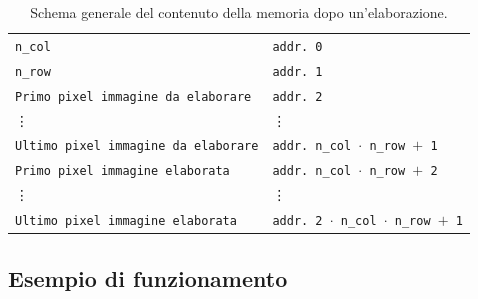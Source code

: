 \documentclass{article}
\begin{document}
\begin{table}[h]
    \centering
    \def\arraystretch{1.3} %
    \caption{Schema generale del contenuto della memoria dopo un'elaborazione.}
    \label{tab:schemamem}
    \begin{tabular}{ |l | l }
        \cline{1-1}
        \texttt{n\_col}                             & \texttt{addr. 0}                                     \\\cline{1-1}
        \texttt{n\_row}                             & \texttt{addr. 1}                                     \\\cline{1-1}
        \texttt{Primo pixel immagine da elaborare}  & \texttt{addr. 2}                                     \\\cline{1-1}
        \vdots                                      & \vdots                                               \\\cline{1-1}
        \texttt{Ultimo pixel immagine da elaborare} & \texttt{addr. n\_col $\cdot$ n\_row $+$ 1}           \\\cline{1-1}
        \texttt{Primo pixel immagine elaborata}     & \texttt{addr. n\_col $\cdot$ n\_row $+$ 2}           \\\cline{1-1}
        \vdots                                      & \vdots                                               \\\cline{1-1}
        \texttt{Ultimo pixel immagine elaborata}    & \texttt{addr. 2 $\cdot$ n\_col $\cdot$ n\_row $+$ 1} \\\cline{1-1}
    \end{tabular}
\end{table}
\vspace{0.2cm}

\subsection{Esempio di funzionamento} %
\label{sec:esempio}
\end{document}
